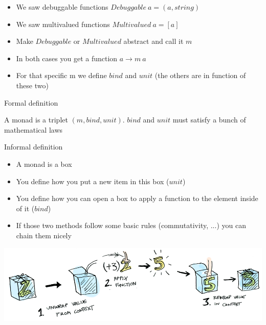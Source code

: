 \begin{frame}[fragile]{}
    \begin{block}{}
        \begin{itemize}
            \item We saw debuggable functions $Debuggable \: a = (a, string)$
            \item We saw multivalued functions $Multivalued \: a = [a]$
            \item Make $Debuggable$ or $Multivalued$ abstract and call it $m$
            \item In both cases you get a function $a \rightarrow m \: a$
            \item For that specific m we define $bind$ and $unit$ (the others are in function of these two)
        \end{itemize}
    \end{block}
\end{frame}

\begin{frame}[fragile]{Formal definition}
    \begin{block}{}
        A monad is a triplet $(m, bind, unit)$. $bind$ and $unit$ must satisfy a bunch of mathematical laws
    \end{block}
\end{frame}

\begin{frame}[fragile]{Informal definition}
    \begin{block}{}
        \begin{itemize}
            \item A monad is a box
            \item You define how you put a new item in this box ($unit$)
            \item You define how you can open a box to apply a function to the element inside of it ($bind$)
            \item If those two methods follow some basic rules (commutativity, ...) you can chain them nicely
        \end{itemize}
        \begin{center}
            \includegraphics[scale=0.3]{images/monad_box}
        \end{center}
    \end{block}
\end{frame}

